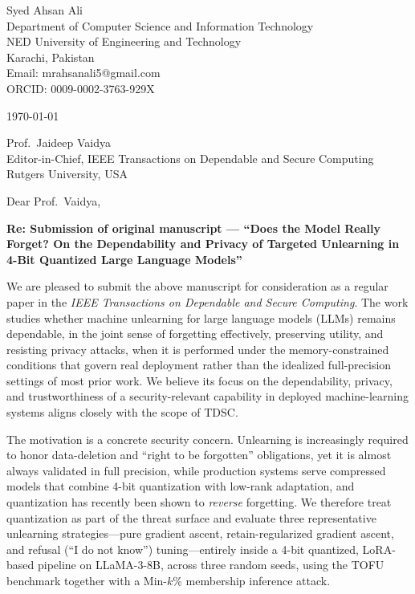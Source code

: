\documentclass[11pt]{article}
\begin{document}
Syed Ahsan Ali \\
Department of Computer Science and Information Technology \\
NED University of Engineering and Technology \\
Karachi, Pakistan \\
Email: mrahsanali5@gmail.com \\
ORCID: 0009-0002-3763-929X

\vspace{1.0em}
\today

\vspace{1.0em}
Prof.\ Jaideep Vaidya \\
Editor-in-Chief, IEEE Transactions on Dependable and Secure Computing \\
Rutgers University, USA

\vspace{0.8em}
Dear Prof.\ Vaidya,

\textbf{Re: Submission of original manuscript --- ``Does the Model Really Forget? On the Dependability and Privacy of Targeted Unlearning in 4-Bit Quantized Large Language Models''}

We are pleased to submit the above manuscript for consideration as a regular paper in the \emph{IEEE Transactions on Dependable and Secure Computing}. The work studies whether machine unlearning for large language models (LLMs) remains dependable, in the joint sense of forgetting effectively, preserving utility, and resisting privacy attacks, when it is performed under the memory-constrained conditions that govern real deployment rather than the idealized full-precision settings of most prior work. We believe its focus on the dependability, privacy, and trustworthiness of a security-relevant capability in deployed machine-learning systems aligns closely with the scope of TDSC.

The motivation is a concrete security concern. Unlearning is increasingly required to honor data-deletion and ``right to be forgotten'' obligations, yet it is almost always validated in full precision, while production systems serve compressed models that combine 4-bit quantization with low-rank adaptation, and quantization has recently been shown to \emph{reverse} forgetting. We therefore treat quantization as part of the threat surface and evaluate three representative unlearning strategies---pure gradient ascent, retain-regularized gradient ascent, and refusal (``I do not know'') tuning---entirely inside a 4-bit quantized, LoRA-based pipeline on LLaMA-3-8B, across three random seeds, using the TOFU benchmark together with a Min-$k$\% membership inference attack.
\end{document}
